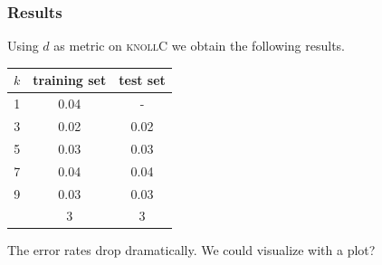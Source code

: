 \documentclass{article}
\newcommand{\vect}[1]{\ensuremath{\boldsymbol{\mathbf{#1}}}\xspace}
\newcommand{\knollC}{\textsc{knollC}\xspace}
\begin{document}


\subsubsection{Results}
Using $d$ as metric on \knollC we obtain the following results.

\begin{table}
  \centering
  \begin{tabular}{c | c|c }
    $k$ & training set & test set\\ \hline
    1 & 0.04 &   - \\
    3 & 0.02 & 0.02\\
    5 & 0.03 & 0.03\\ 
    7 & 0.04 & 0.04\\ 
    9 & 0.03 & 0.03 \\\hline\hline
    \hfill & 3 & 3
  \end{tabular}
\end{table}

The error rates drop dramatically. We could visualize with a plot?
\end{document}

